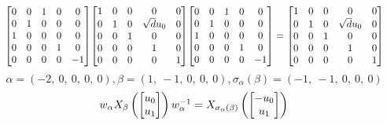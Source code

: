 \documentclass[11pt]{article}
\theoremstyle{definition}
\begin{document}
\[
\scaletoalign{\textwidth}{{\left[\begin{matrix}0 & 0 & 1 & 0 & 0\\0 & 1 & 0 & 0 & 0\\1 & 0 & 0 & 0 & 0\\0 & 0 & 0 & 1 & 0\\0 & 0 & 0 & 0 & -1\end{matrix}\right]} {\left[\begin{matrix}1 & 0 & 0 & 0 & 0\\0 & 1 & 0 & \sqrt{d} u_{0} & 0\\0 & 0 & 1 & 0 & 0\\0 & 0 & 0 & 1 & 0\\0 & 0 & 0 & 0 & 1\end{matrix}\right]} {\left[\begin{matrix}0 & 0 & 1 & 0 & 0\\0 & 1 & 0 & 0 & 0\\1 & 0 & 0 & 0 & 0\\0 & 0 & 0 & 1 & 0\\0 & 0 & 0 & 0 & -1\end{matrix}\right]} = {\left[\begin{matrix}1 & 0 & 0 & 0 & 0\\0 & 1 & 0 & \sqrt{d} u_{0} & 0\\0 & 0 & 1 & 0 & 0\\0 & 0 & 0 & 1 & 0\\0 & 0 & 0 & 0 & 1\end{matrix}\right]}}
\]
\[
\alpha = \left( -2, \  0, \  0, \  0, \  0\right), \beta = \left( 1, \  -1, \  0, \  0, \  0\right), \sigma_{\alpha}(\beta) = \left( -1, \  -1, \  0, \  0, \  0\right)
\]
\[
\scaletoalign{\textwidth}{w_{\alpha} X_{\beta}\left(\left[\begin{matrix}u_{0}\\u_{1}\end{matrix}\right]\right) w_{\alpha}^{-1} = X_{\sigma_{\alpha}\left(\beta\right)}\left(\left[\begin{matrix}- u_{0}\\u_{1}\end{matrix}\right]\right)}
\]
\end{document}
